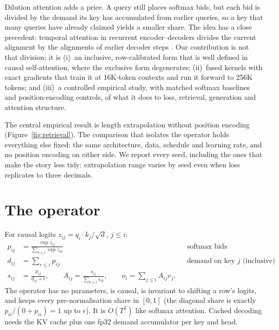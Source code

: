 \documentclass[11pt]{article}
\begin{document}
Dilution attention adds a price. A query still places softmax bids, but each bid is divided by the
demand its key has accumulated from earlier queries, so a key that many queries have already claimed
yields a smaller share. The idea has a close precedent: temporal attention in recurrent
encoder--decoders divides the current alignment by the alignments of earlier decoder steps
\cite{sankaran,paulus}. Our contribution is not that division; it is (i)~an inclusive, row-calibrated
form that is well defined in causal self-attention, where the exclusive form degenerates; (ii)~fused
kernels with exact gradients that train it at 16K-token contexts and run it forward to 256K tokens; and (iii)~a controlled
empirical study, with matched softmax baselines and position-encoding controls, of what it does to
loss, retrieval, generation and attention structure.

The central empirical result is length extrapolation without position encoding
(Figure~\ref{fig:retrieval}). The comparison that isolates the operator holds everything else fixed:
the same architecture, data, schedule and learning rate, and no position encoding on either side.
We report every seed, including the ones that make the story less tidy: extrapolation range varies by
seed even when loss replicates to three decimals.

\section{The operator}

For causal logits $z_{ij} = q_i \cdot k_j/\sqrt{d}$, $j \le i$:
\begin{align}
p_{ij} &= \frac{\exp z_{ij}}{\sum_{k \le i} \exp z_{ik}} && \text{softmax bids}\\
d_{ij} &= \sum_{r \le i} p_{rj} && \text{demand on key } j \text{ (inclusive)}\\
s_{ij} &= \frac{p_{ij}}{d_{ij} + \epsilon}, \qquad
A_{ij} = \frac{s_{ij}}{\sum_{k \le i} s_{ik}}, \qquad
o_i = \sum_{j \le i} A_{ij} v_j .
\end{align}
The operator has no parameters, is causal, is invariant to shifting a row's logits, and keeps every
pre-normalisation share in $[0,1]$ (the diagonal share is exactly $p_{ii}/(0 + p_{ii}) = 1$ up to
$\epsilon$). It is $O(T^2)$ like softmax attention. Cached decoding needs the KV cache plus one fp32
demand accumulator per key and head.
\end{document}
